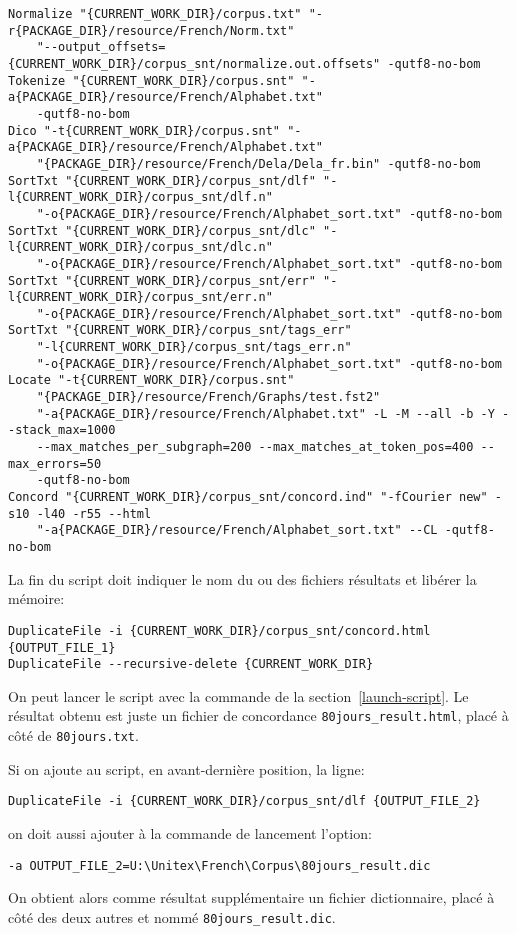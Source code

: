 \begin{Verbatim}[fontsize=\small,fontfamily=helvetica]
Normalize "{CURRENT_WORK_DIR}/corpus.txt" "-r{PACKAGE_DIR}/resource/French/Norm.txt" 
    "--output_offsets={CURRENT_WORK_DIR}/corpus_snt/normalize.out.offsets" -qutf8-no-bom
Tokenize "{CURRENT_WORK_DIR}/corpus.snt" "-a{PACKAGE_DIR}/resource/French/Alphabet.txt"
    -qutf8-no-bom
Dico "-t{CURRENT_WORK_DIR}/corpus.snt" "-a{PACKAGE_DIR}/resource/French/Alphabet.txt" 
    "{PACKAGE_DIR}/resource/French/Dela/Dela_fr.bin" -qutf8-no-bom
SortTxt "{CURRENT_WORK_DIR}/corpus_snt/dlf" "-l{CURRENT_WORK_DIR}/corpus_snt/dlf.n" 
    "-o{PACKAGE_DIR}/resource/French/Alphabet_sort.txt" -qutf8-no-bom
SortTxt "{CURRENT_WORK_DIR}/corpus_snt/dlc" "-l{CURRENT_WORK_DIR}/corpus_snt/dlc.n" 
    "-o{PACKAGE_DIR}/resource/French/Alphabet_sort.txt" -qutf8-no-bom
SortTxt "{CURRENT_WORK_DIR}/corpus_snt/err" "-l{CURRENT_WORK_DIR}/corpus_snt/err.n" 
    "-o{PACKAGE_DIR}/resource/French/Alphabet_sort.txt" -qutf8-no-bom
SortTxt "{CURRENT_WORK_DIR}/corpus_snt/tags_err"
    "-l{CURRENT_WORK_DIR}/corpus_snt/tags_err.n" 
    "-o{PACKAGE_DIR}/resource/French/Alphabet_sort.txt" -qutf8-no-bom
Locate "-t{CURRENT_WORK_DIR}/corpus.snt"
    "{PACKAGE_DIR}/resource/French/Graphs/test.fst2" 
    "-a{PACKAGE_DIR}/resource/French/Alphabet.txt" -L -M --all -b -Y --stack_max=1000
    --max_matches_per_subgraph=200 --max_matches_at_token_pos=400 --max_errors=50
    -qutf8-no-bom
Concord "{CURRENT_WORK_DIR}/corpus_snt/concord.ind" "-fCourier new" -s10 -l40 -r55 --html 
    "-a{PACKAGE_DIR}/resource/French/Alphabet_sort.txt" --CL -qutf8-no-bom
\end{Verbatim}

\noindent La fin du script doit indiquer le nom du ou des fichiers résultats et libérer la mémoire:

\begin{Verbatim}[fontsize=\small,fontfamily=helvetica]
DuplicateFile -i {CURRENT_WORK_DIR}/corpus_snt/concord.html {OUTPUT_FILE_1}
DuplicateFile --recursive-delete {CURRENT_WORK_DIR}
\end{Verbatim}

\noindent On peut lancer le script avec la commande de la section~\ref{launch-script}. Le résultat
obtenu est juste un fichier de concordance \verb$80jours_result.html$, placé à côté de
\verb$80jours.txt$.

\bigskip
\noindent Si on ajoute au script, en avant-dernière position, la ligne:

\begin{Verbatim}[fontsize=\small,fontfamily=helvetica]
DuplicateFile -i {CURRENT_WORK_DIR}/corpus_snt/dlf {OUTPUT_FILE_2}
\end{Verbatim}

\noindent on doit aussi ajouter à la commande de lancement l'option:

\begin{Verbatim}[fontsize=\small,fontfamily=helvetica]
-a OUTPUT_FILE_2=U:\Unitex\French\Corpus\80jours_result.dic
\end{Verbatim}

\noindent On obtient alors comme résultat supplémentaire un fichier dictionnaire,
placé à côté des deux autres et nommé \verb$80jours_result.dic$.
